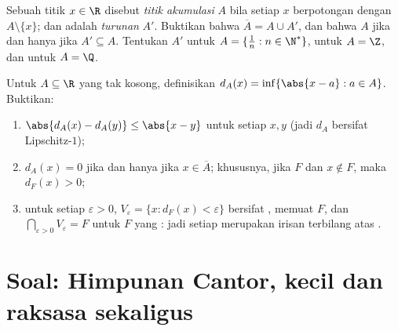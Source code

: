 \begin{exercise}[$\star\star$]\label{exo:b1:topology:11}
Sebuah titik $x \in \R$ disebut \emph{titik akumulasi} $A$ bila
setiap  $x$ berpotongan dengan $A \setminus \{x\}$; dan  adalah
\emph{ turunan} $A'$. Buktikan bahwa $\overline A = A \cup A'$,
dan bahwa $A$  jika dan hanya jika $A' \subseteq A$. Tentukan
$A'$ untuk $A = \{\frac 1n : n \in \N^*\}$, untuk $A = \Z$, dan untuk
$A = \Q$.
\end{exercise}

\begin{exercise}[$\star\star\star$]\label{exo:b1:topology:12}
Untuk $A \subseteq \R$ yang tak kosong, definisikan $d_A(x) = \inf\{\abs{x - a}
: a \in A\}$. Buktikan:
\begin{enumerate}
  \item $\abs{d_A(x) - d_A(y)} \leq \abs{x - y}$ untuk setiap $x, y$
        (jadi $d_A$ bersifat Lipschitz-$1$);
  \item $d_A(x) = 0$ jika dan hanya jika $x \in \overline A$;
        khususnya, jika $F$  dan $x \notin F$, maka
        $d_F(x) > 0$;
  \item untuk setiap $\varepsilon > 0$,  $V_\varepsilon =
        \{x : d_F(x) < \varepsilon\}$ bersifat , memuat $F$, dan
        $\bigcap_{\varepsilon > 0} V_\varepsilon = F$ untuk $F$ yang
        : jadi setiap  merupakan irisan terbilang atas
        .
\end{enumerate}
\end{exercise}

\section{Soal: Himpunan Cantor, kecil dan raksasa sekaligus}

